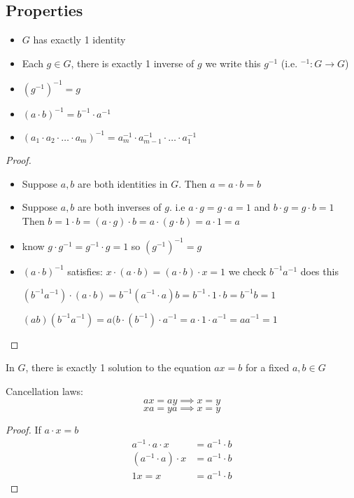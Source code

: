 \subsection{Properties}
\begin{itemize}
  \item $G$ has exactly 1 identity
  \item Each $g \in G$, there is exactly 1 inverse of $g$ we write this $g^{-1}$
  (i.e. $^{-1}: G \rightarrow G$)
  \item $(g^{-1})^{-1} = g$
  \item $(a \cdot b)^{-1} = b^{-1} \cdot a^{-1}$
  \item $(a_1 \cdot a_2 \cdot \dotsc \cdot a_m)^{-1} = a_m^{-1} \cdot a_{m-1}^{-1} \cdot \dotsc \cdot a_1^{-1}$
\end{itemize}

\begin{proof}
  \text{}
  \begin{itemize}
    \item Suppose $a, b$ are both identities in $G$. Then $a = a \cdot b = b$
    \item Suppose $a, b$ are both inverses of $g$. i.e $a\cdot g = g\cdot a = 1$ and 
    $b\cdot g = g\cdot b = 1$ Then $b = 1\cdot b = (a\cdot g)\cdot b = a\cdot(g\cdot b) = a\cdot 1 = a$ 
    \item know $g\cdot g^{-1} = g^{-1}\cdot g = 1$ so $(g^{-1})^{-1} = g$
    \item $(a \cdot b)^{-1}$ satisfies: $x\cdot(a\cdot b) = (a\cdot b)\cdot x = 1$ 
    we check $b^{-1}a^{-1}$ does this 

    $(b^{-1}a^{-1})\cdot(a\cdot b) = b^{-1}(a^{-1}\cdot a)b = b^{-1} \cdot 1 \cdot b = b^{-1}b = 1$

    $(ab)(b^{-1}a^{-1}) = a(b\cdot(b^{-1})\cdot a^{-1} = a \cdot 1 \cdot a^{-1} = aa^{-1} = 1$
  \end{itemize}
\end{proof}

\begin{theorem}
  In $G$, there is exactly 1 solution to the equation $ax = b$ for a fixed $a, b \in G$
\end{theorem}

\begin{corollary}
  Cancellation laws:
  \[ax = ay \implies x = y\]
  \[xa = ya \implies x = y\]
\end{corollary}

\begin{proof}
  If $a\cdot x = b$
  \begin{align*}
    a^{-1}\cdot a\cdot x &= a^{-1}\cdot b \\
    (a^{-1}\cdot a)\cdot x &= a^{-1}\cdot b \\
    1x = x &= a^{-1}\cdot b
  \end{align*}
\end{proof}

